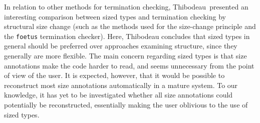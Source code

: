 In relation to other methods for termination checking, Thibodeau\,\citep{Thibodeau11} presented an interesting comparison between sized types and termination checking by structural size change (such as the methods used for the size-change principle and the \texttt{foetus} termination checker). Here, Thibodeau concludes that sized types in general should be preferred over approaches examining structure, since they generally are more flexible. The main concern regarding sized types is that size annotations make the code harder to read, and seems unnecessary from the point of view of the user. It is expected, however, that it would be possible to reconstruct most size annotations automatically in a mature system. To our knowledge, it has yet to be investigated whether all size annotations could potentially be reconstructed, essentially making the user oblivious to the use of sized types.

